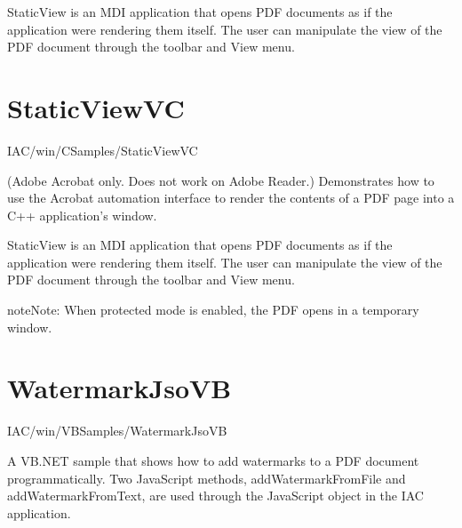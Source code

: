 \documentclass[letterpaper,12pt,english,openany,oneside]{sphinxmanual}
\begin{document}
\label{\detokenize{Samples_WindowsIAC:usage-14}}

StaticView is an MDI application that opens PDF documents as if the application were rendering them itself. The user can manipulate the view of the PDF document through the toolbar and View menu.


\section{StaticViewVC}
\label{\detokenize{Samples_WindowsIAC:staticviewvc}}\label{\detokenize{Samples_WindowsIAC:location-23}}

IAC/win/CSamples/StaticViewVC

\label{\detokenize{Samples_WindowsIAC:description-23}}

(Adobe Acrobat only. Does not work on Adobe Reader.) Demonstrates how to use the Acrobat automation interface to render the contents of a PDF page into a C++ application’s window.

\label{\detokenize{Samples_WindowsIAC:usage-15}}

StaticView is an MDI application that opens PDF documents as if the application were rendering them itself. The user can manipulate the view of the PDF document through the toolbar and View menu.

\begin{sphinxadmonition}{note}{Note:}
When protected mode is enabled, the PDF opens in a temporary window.
\end{sphinxadmonition}


\section{WatermarkJsoVB}
\label{\detokenize{Samples_WindowsIAC:watermarkjsovb}}\label{\detokenize{Samples_WindowsIAC:location-24}}

IAC/win/VBSamples/WatermarkJsoVB

\label{\detokenize{Samples_WindowsIAC:description-24}}

A VB.NET sample that shows how to add watermarks to a PDF document programmatically. Two JavaScript methods, addWatermarkFromFile and addWatermarkFromText, are used through the JavaScript object in the IAC application.
\end{document}
